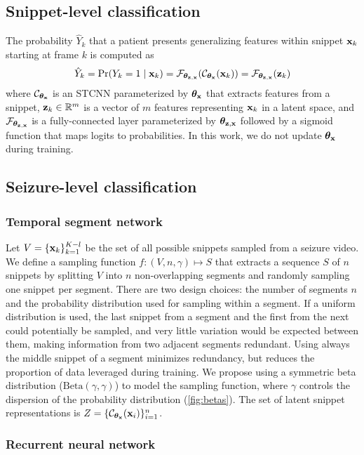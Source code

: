 \subsection{Snippet-level classification}
\label{sec:snippet-level}

The probability $\hat{Y}_k$ that a patient presents generalizing features within snippet $\mathbf{x}_k$ starting at frame $k$ is computed as
\begin{equation}
    \hat{Y}_k = \Pr(Y_k = 1 \mid \mathbf{x}_k) = \mathcal{F}_{\bm{\theta}_{\mathbf{z},\mathbf{x}}}( \mathcal{C}_{\bm{\theta}_{\mathbf{x}}}(\mathbf{x}_k) ) = \mathcal{F}_{\bm{\theta}_{\mathbf{z},\mathbf{x}}}( \mathbf{z}_k)
\end{equation}
where
$\mathcal{C}_{\bm{\theta}_{\mathbf{x}}}$ is an \ac{STCNN} parameterized by $\bm{\theta}_{\mathbf{x}}$ that extracts features from a snippet,
$\mathbf{z}_k \in \mathbb{R} ^ m$ is a vector of $m$ features representing $\mathbf{x}_k$ in a latent space,
and
$\mathcal{F}_{\bm{\theta}_{\mathbf{z},\mathbf{x}}}$ is a fully-connected layer parameterized by $\bm{\theta}_{\mathbf{z},\mathbf{x}}$ followed by a sigmoid function that maps logits to probabilities.
In this work, we do not update $\bm{\theta}_{\mathbf{x}}$ during training.


\subsection{Seizure-level classification}
\label{sec:meth_seizure}

\subsubsection{Temporal segment network}
Let $V = \{ \mathbf{x}_k \}_{k=1}^{K-l}$ be the set of all possible snippets sampled from a seizure video.
We define a sampling function $f : (V, n, \gamma) \mapsto S$ that extracts a sequence $S$ of $n$ snippets by splitting $V$ into $n$ non-overlapping segments and randomly sampling one snippet per segment.
There are two design choices: the number of segments $n$ and the probability distribution used for sampling within a segment.
If a uniform distribution is used, the last snippet from a segment and the first from the next could potentially be sampled, and very little variation would be expected between them, making information from two adjacent segments redundant.
Using always the middle snippet of a segment minimizes redundancy, but reduces the proportion of data leveraged during training.
We propose using a symmetric beta distribution ($\text{Beta}(\gamma, \gamma)$) to model the sampling function, where $\gamma$ controls the dispersion of the probability distribution (\cref{fig:betas}).
The set of latent snippet representations is $Z = \{ \mathcal{C}_{\bm{\theta}_{\mathbf{x}}} (\mathbf{x}_i) \}_{i = 1}^{n}$.


\subsubsection{Recurrent neural network}

